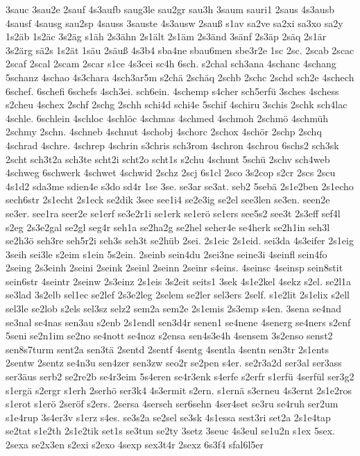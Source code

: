 {3sauc
3sau2e
2sauf
4s3aufb
saug3le
sau2gr
sau3h
3saum
sauri1
2saus
4s3ausb
4sausf
4sausg
sau2sp
4sauss
3sauste
4s3ausw
2sauß
s1av
sa2ve
sa2xi
sa3xo
sa2y
1s2äb
1s2äc
3s2äg
s1äh
2s3ähn
2s1ält
2s1äm
2s3änd
3sänf
2s3äp
2säq
2s1är
3s2ärg
sä2s
1s2ät
1säu
2säuß
4s3b4
sba4ne
sbau6men
sbe3r2e
1sc
2sc.
2scab
2scac
2scaf
2scal
2scam
2scar
s1ce
4s3cei
sc4h
6sch.
s2chal
sch3ana
4schanc
4schang
5schanz
4schao
4s3chara
4sch3ar5m
s2chä
2schäq
2schb
2schc
2schd
sch2e
4schech
6schef.
6schefi
6schefs
4sch3ei.
sch6ein.
4schemp
s4cher
sch5erfü
3sches
4schess
s2cheu
4schex
2schf
2schg
2schh
schi4d
schi4e
5schif
4schiru
3schis
2schk
sch4lac
4schle.
6schlein
4schloc
4schlöc
4schmas
4schmed
4schmoh
2schmö
4schmüh
2schmy
2schn.
4schneb
4schnut
4schobj
4schorc
2schox
4schör
2schp
2schq
4schrad
4schre.
4schrep
4schrin
s3chris
sch3rom
4schron
4schrou
6schs2
sch3sk
2scht
sch3t2a
sch3te
scht2i
scht2o
scht1s
s2chu
4schunt
5schü
2schv
sch4web
4schweg
6schwerk
4schwet
4schwid
2schz
2scj
6s1cl
2sco
3s2cop
s2cr
2scs
2scu
4s1d2
sda3me
sdien4e
s3do
sd4r
1se
3se.
se3ar
se3at.
seb2
5sebä
2s1e2ben
2s1echo
sech6str
2s1echt
2s1eck
se2dik
3see
see1i4
se2e3ig
se2el
see3len
se3en.
seen2e
se3er.
see1ra
seer2e
se1erf
se3e2r1i
se1erk
se1erö
se1ers
see5s2
see3t
2s3eff
sef4l
s2eg
2s3e2gal
se2gl
seg4r
seh1a
se2ha2g
se2hel
seher4e
se4herk
se2h1in
seh3l
se2h3ö
seh3re
seh5r2i
seh3s
seh3t
se2hüb
2sei.
2s1eic
2s1eid.
sei3da
4s3eifer
2s1eig
3seih
sei3le
s2eim
s1ein
5s2ein.
2seinb
sein4du
2sei3ne
seine3i
4seinfl
sein4fo
2seing
2s3einh
2seini
2seink
2seinl
2seinn
2seinr
s4eins.
4seinsc
4seinsp
sein8stit
sein6str
4seintr
2seinw
2s3einz
2s1eis
3s2eit
seits1
3sek
4s1e2kel
4sekz
s2el.
se2l1a
se3lad
3s2elb
sel1ec
se2lef
2s3e2leg
2selem
se2ler
sel3ers
2self.
s1e2lit
2s1elix
s2ell
sel3le
se2lob
s2els
sel3sz
selz2
sem2a
sem2e
2s1emis
2s3emp
s4en.
3sena
se4nad
se3nal
se4nas
sen3au
s2enb
2s1endl
sen3d4r
senen1
se4nene
4senerg
se4ners
s2enf
5seni
se2n1im
se2no
se4nott
se4noz
s2ensa
sen4s3e4h
4sensem
3s2enso
senst2
sen8s7turm
sent2a
sen3tä
2sentd
2sentf
4sentg
4sentla
4sentn
sen3tr
2s1ents
2sentw
2sentz
se4n3u
sen4zer
sen3zw
seo2r
se2pen
s4er.
se2r3a2d
ser3al
ser3ass
ser3äus
serb2
se2re2b
se4r3eim
5s4eren
se4r3enk
s4erfe
s2erfr
s1erfü
4serfül
ser3g2
s1ergä
s2ergr
s1erh
2serhö
ser3k4
4s3ermit
s2ern.
s1ernä
s3erneu
4s3ernt
2s1e2ros
s1erot
s1erö
2seröf
s2ers.
2sersa
4serseh
ser6sehn
4ser4set
se3ru
se4ruh
ser2um
s1e4rup
3s4er3v
s1erz
s4es.
se3s2a
se2sel
se3sk
4s1essa
sest3ri
set2a
2s1e4tap
se2tat
s1e2th
2s1e2tik
set1s
se3tun
se2ty
3setz
3seuc
4s3eul
se1u2n
s1ex
5sex.
2sexa
se2x3en
s2exi
s2exo
4sexp
sex3t4r
2sexz
6s3f4
sfal6l5er
}
